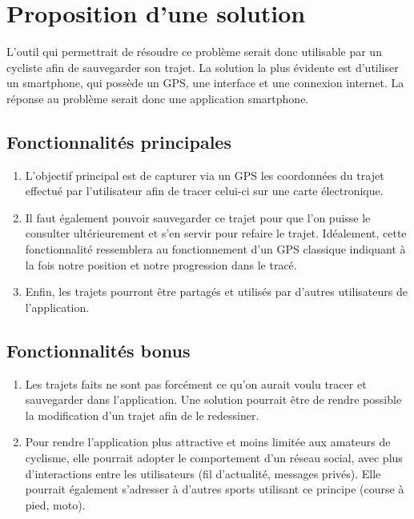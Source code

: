 \section{Proposition d'une solution}
L'outil qui permettrait de résoudre ce problème serait donc utilisable par un cycliste afin de sauvegarder son trajet. La solution la plus évidente
est d'utiliser un smartphone, qui possède un GPS, une interface et une connexion internet. La réponse au problème serait donc une application
smartphone.

\subsection{Fonctionnalités principales}
\begin{enumerate}
  \item L'objectif principal est de capturer via un GPS les coordonnées du trajet effectué par l'utilisateur afin de tracer celui-ci sur une carte
  électronique.
  \item Il faut également pouvoir sauvegarder ce trajet pour que l'on puisse le consulter ultérieurement et s'en servir pour refaire le trajet.
  Idéalement, cette fonctionnalité ressemblera au fonctionnement d'un GPS classique indiquant à la fois notre position et notre progression dans le tracé.
  \item Enfin, les trajets pourront être partagés et utilisés par d'autres utilisateurs de l'application.
\end{enumerate}

\subsection{Fonctionnalités bonus}
\begin{enumerate}
  \item Les trajets faits ne sont pas forcément ce qu'on aurait voulu tracer et sauvegarder dans l'application. Une solution pourrait être de
  rendre possible la modification d'un trajet afin de le redessiner.
  \item Pour rendre l'application plus attractive et moins limitée aux amateurs de cyclisme, elle pourrait adopter le comportement d'un réseau
  social, avec plus d'interactions entre les utilisateurs (fil d'actualité, messages privés). Elle pourrait également s'adresser à d'autres sports utilisant ce principe (course à pied, moto).
\end{enumerate}